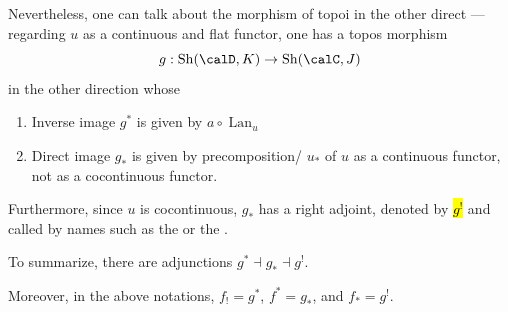 \begin{definition}
    Nevertheless, one can talk about the morphism of topoi in the other direct --- regarding $u$ as a continuous and flat functor, one has a topos morphism 
    $$g : \operatorname{Sh}(\calD, K) \to \operatorname{Sh}(\calC, J)$$
    in the other direction whose 
    \begin{enumerate}
        \item Inverse image $g^*$ is given by $a \circ \operatorname{Lan}_u$
        \item Direct image $g_*$ is given by precomposition/ $u_*$ of $u$ as a continuous functor, not as a cocontinuous functor.
    \end{enumerate}
    Furthermore, since $u$ is cocontinuous, $g_*$ has a right adjoint, denoted by \hl{$g^!$} and called by names such as the  or the  . 

    To summarize, there are adjunctions $g^* \dashv g_* \dashv g^!$.

    Moreover, in the above notations, $f_! = g^*$, $f^* = g_*$, and $f_* = g^!$.
\end{definition}